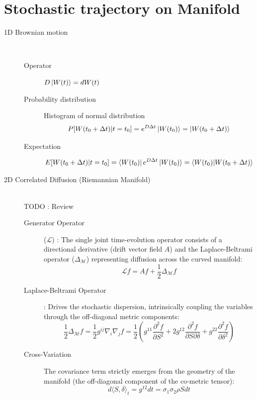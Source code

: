 \documentclass{article}
\begin{document}
\section{Stochastic trajectory on Manifold}
\begin{description}
    \item[1D Brownian motion] ~\\
          \begin{description}
              \item[Operator] $D \ket{W(t)} = dW(t) $
              \item[Probability distribution] Histogram of normal distribution\\
                    \begin{equation*}
                        P[W(t_0+\Delta t) | t=t_0] = e^{D \Delta t} \ket{W(t_0)} = \ket{W(t_0+ \Delta t)}
                    \end{equation*}
              \item[Expectation]
                    \begin{equation*}
                        E[W(t_0+\Delta t) | t=t_0] = \bra{W(t_0)} e^{D \Delta t} \ket{W(t_0)} = \bra{W(t_0)} \ket{W(t_0+ \Delta t)}
                    \end{equation*}
          \end{description}
    \item[2D Correlated Diffusion (Riemannian Manifold)] ~\\
          TODO : Review
          \begin{description}
              \item[Generator Operator] ($\mathcal{L}$) :  The single joint time-evolution operator consists of a directional derivative (drift vector field $A$) and the Laplace-Beltrami operator ($\Delta_{\mathcal{M}}$) representing diffusion across the curved manifold:
                    \begin{equation*}
                        \mathcal{L} f = A f + \frac{1}{2} \Delta_{\mathcal{M}} f
                    \end{equation*}
              \item[Laplace-Beltrami Operator] : Drives the stochastic dispersion, intrinsically coupling the variables through the off-diagonal metric components:
                    \begin{equation*}
                        \frac{1}{2} \Delta_{\mathcal{M}} f = \frac{1}{2} g^{ij} \nabla_i \nabla_j f = \frac{1}{2} \left( g^{11} \frac{\partial^2 f}{\partial S^2} + 2 g^{12} \frac{\partial^2 f}{\partial S \partial \delta} + g^{22} \frac{\partial^2 f}{\partial \delta^2} \right)
                    \end{equation*}
              \item[Cross-Variation] The covariance term strictly emerges from the geometry of the manifold (the off-diagonal component of the co-metric tensor):
                    \begin{equation*}
                        d\langle S, \delta \rangle_t = g^{12} dt = \sigma_1 \sigma_2 \rho S dt
                    \end{equation*}
          \end{description}
\end{description}
\end{document}
